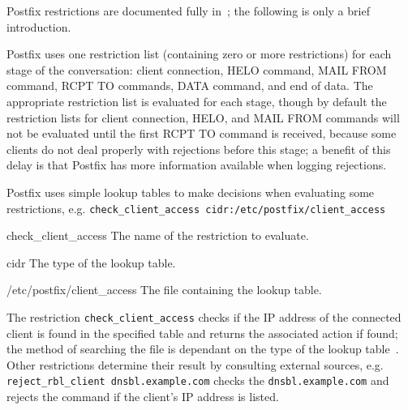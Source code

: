 \label{Mixing and matching Postfix restrictions}

Postfix restrictions are documented fully in~\cite{smtpd_per_user_control,
policy-servers, smtpd_access_readme}; the following is only a brief
introduction.

Postfix uses one restriction list (containing zero or more restrictions)
for each stage of the  conversation: client connection, HELO
command, MAIL FROM command, RCPT TO commands, DATA command, and end of
data.  The appropriate restriction list is evaluated for each stage, though
by default the restriction lists for client connection, HELO, and MAIL FROM
commands will not be evaluated until the first RCPT TO command is received,
because some clients do not deal properly with rejections before this
stage; a benefit of this delay is that Postfix has more information
available when logging rejections.

Postfix uses simple lookup tables to make decisions when evaluating some
restrictions, e.g.\newline{}
\tab{}\texttt{check\_client\_access~cidr:/etc/postfix/client\_access}

\begin{boldeqlist}

    \item [check\_client\_access] The name of the restriction to evaluate.

    \item [cidr] The type of the lookup table.

    \item [/etc/postfix/client\_access] The file containing the lookup
        table.

\end{boldeqlist}

The restriction \texttt{check\_client\_access} checks if the IP address of
the connected client is found in the specified table and returns the
associated action if found; the method of searching the file is dependant
on the type of the lookup table~\cite{postfix-lookup-tables}.  Other
restrictions determine their result by consulting external sources,
e.g.\newline{} \tab{}\texttt{reject\_rbl\_client
dnsbl.example.com}\newline{} checks the 
\texttt{dnsbl.example.com} and rejects the command if the client's IP
address is listed.

